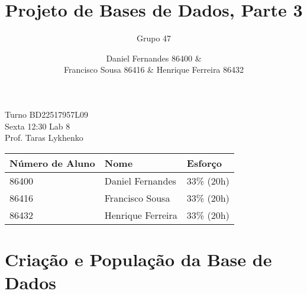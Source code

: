 \documentclass[10pt,a4paper]{article}
\author{Grupo 47 \and Daniel Fernandes 86400 \& \\Francisco Sousa 86416 \& Henrique Ferreira 86432}
\title{Projeto de Bases de Dados, Parte 3}
\begin{document}
\maketitle

\begin{center}
Turno BD22517957L09 \\
Sexta 12:30 Lab 8 \\
Prof. Taras Lykhenko \\
\end{center}

\begin{table}[h]
    \centering
    \begin{tabular}{lll}
    \hline
    \textbf{Número de Aluno} & \textbf{Nome} & \textbf{Esforço} \\ \hline
    86400 & Daniel Fernandes & 33\% (20h) \\ \hline
    86416 & Francisco Sousa & 33\% (20h) \\ \hline
    86432 & Henrique Ferreira & 33\% (20h) \\ \hline
    \end{tabular}
\end{table}
\newpage

\section{Criação e População da Base de Dados}
\end{document}
